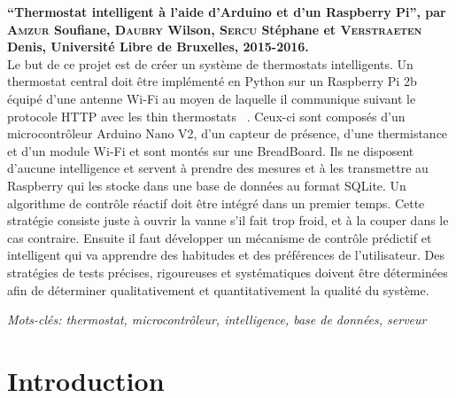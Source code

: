 \documentclass[11pt,a4paper,11pt]{report}
\let\pagebreakORIG\pagebreak
\let\clearpageORIG\clearpage
\let\cleardoublepageORIG\cleardoublepage
\newcommand{\removepagebreak}{\renewcommand{\pagebreak}{}\renewcommand{\clearpage}{}\renewcommand{\cleardoublepage}{}}
\newcommand{\restorepagebreak}{\renewcommand{\pagebreak}{\pagebreakORIG}\renewcommand{\clearpage}{\clearpageORIG}\renewcommand{\cleardoublepage}{\cleardoublepageORIG}}
\begin{document}
\textbf{“Thermostat intelligent à l'aide d'Arduino et d'un Raspberry Pi”,
par \textsc{Amzur} Soufiane, \textsc{Daubry} Wilson, \textsc{Sercu} Stéphane et \textsc{Verstraeten} Denis, Université Libre de Bruxelles, 2015-2016.}
\vspace{0.2cm}\\
Le but de ce projet est de créer un système de thermostats intelligents. Un thermostat central doit être implémenté en Python sur un Raspberry Pi 2b équipé d'une antenne Wi-Fi au moyen de laquelle il communique suivant le protocole HTTP avec les \og thin thermostats \fg ~. Ceux-ci sont composés d'un microcontrôleur Arduino Nano V2, d'un capteur de présence, d'une thermistance et d'un module Wi-Fi et sont montés sur une BreadBoard. Ils ne disposent d'aucune intelligence et servent à prendre des mesures et à les transmettre au Raspberry qui les stocke dans une base de données au format SQLite. Un algorithme de contrôle réactif doit être intégré dans un premier temps. Cette stratégie consiste juste à ouvrir la vanne s'il fait trop froid, et à la couper dans le cas contraire. Ensuite il faut développer un mécanisme de contrôle prédictif et intelligent qui va apprendre des habitudes et des préférences de l'utilisateur. Des stratégies de tests précises, rigoureuses et systématiques doivent être déterminées afin de déterminer qualitativement et quantitativement la qualité du système.\newline

\textit{Mots-clés:  thermostat, microcontrôleur, intelligence, base de données, serveur}


\newpage


\renewcommand{\contentsname}{Table des matières}
\tableofcontents
\listoffigures  %
\removepagebreak
\listoftables 
\restorepagebreak

\renewcommand{\baselinestretch}{1.5}

\chapter{Introduction}
\end{document}

